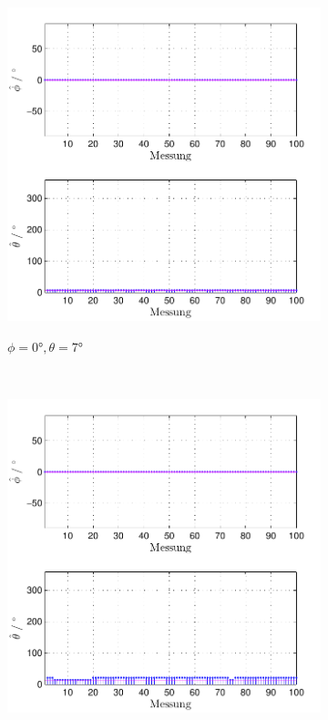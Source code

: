\begin{figure}
\begin{subfigure}[b]{0.48\textwidth}
                \includegraphics[width=\textwidth]{grafiken/04_Echtzeitversuch/MALE_Phi_0_Theta_7}
                \label{fig:Foto_DSP_Draufsicht}
                \caption{$\phi=0°, \theta = 7°$}
        \end{subfigure}
        ~ %
        \begin{subfigure}[b]{0.48\textwidth}
                \centering
                \includegraphics[width=\textwidth]{grafiken/04_Echtzeitversuch/MALE_Phi_0_Theta_14}

\end{subfigure}
\end{figure}
